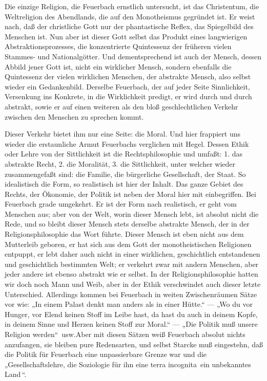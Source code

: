 Die einzige Religion, die Feuerbach ernstlich untersucht, ist
das Christentum, die Weltreligion des Abendlands, die auf den
Monotheismus gegründet ist. Er weist nach, daß der christliche Gott nur
der phantastische Reflex, das Spiegelbild des Menschen ist. Nun aber ist
dieser Gott selbst das Produkt eines langwierigen Abstraktionsprozesses,
die konzentrierte Quintessenz der früheren vielen Stammes- und
Nationalgötter. Und dementsprechend ist auch der Mensch, dessen Abbild
jener Gott ist, nicht ein wirklicher Mensch, sondern ebenfalls die
Quintessenz der vielen wirklichen Menschen, der abstrakte Mensch, also
selbst wieder ein Gedankenbild. Derselbe Feuerbach, der auf jeder Seite
Sinnlichkeit, Versenkung ins Konkrete, in die Wirklichkeit predigt, er
wird durch und durch abstrakt, sowie er auf einen weiteren als den bloß
geschlechtlichen Verkehr zwischen den Menschen zu sprechen kommt.

Dieser Verkehr bietet ihm nur eine Seite: die Moral. Und hier
frappiert uns wieder die erstaunliche Armut Feuerbachs verglichen mit
Hegel. Dessen Ethik oder Lehre von der Sittlichkeit ist die
Rechtsphilosophie und umfaßt: 1. das abstrakte Recht, 2. die Moralität,
3. die Sittlichkeit, unter welcher wieder zusammengefaßt sind: die
Familie, die bürgerliche Gesellschaft, der Staat. So idealistisch die
Form, so realistisch ist hier der Inhalt. Das ganze Gebiet des Rechts,
der Ökonomie, der Politik ist neben der Moral hier mit einbegriffen. Bei
Feuerbach grade umgekehrt. Er ist der Form nach realistisch, er geht vom
Menschen aus; aber von der Welt, worin dieser Mensch lebt, ist absolut
nicht die Rede, und so bleibt dieser Mensch stets derselbe abstrakte
Mensch, der in der Religionsphilosophie das Wort führte. Dieser Mensch
ist eben nicht aus dem Mutterleib geboren, er hat sich aus dem Gott der
monotheistischen Religionen entpuppt, er lebt daher auch nicht in einer
wirklichen, geschichtlich entstandenen und geschichtlich bestimmten
Welt; er verkehrt zwar mit andern Menschen, aber jeder andere ist ebenso
abstrakt wie er selbst. In der Religionsphilosophie hatten wir doch noch
Mann und Weib, aber in der Ethik verschwindet auch dieser letzte
Unterschied. Allerdings kommen bei Feuerbach in weiten Zwischenräumen
Sätze vor wie: „In einem Palast denkt man anders als in einer Hütte.`` ---
„Wo du vor Hunger, vor Elend keinen Stoff im Leibe hast, da hast du auch
in deinem Kopfe, in deinem Sinne und Herzen keinen Stoff zur Moral.`` ---
„Die Politik muß unsere Religion werden``\est\ usw.Aber mit diesen Sätzen weiß
Feuerbach absolut nichts anzufangen, sie bleiben pure Redensarten, und
selbst Starcke muß eingestehn, daß die Politik für Feuerbach eine
unpassierbare Grenze war und die „Gesellschaftslehre, die Soziologie für
ihn eine terra incognita \textbar{}\,ein unbekanntes Land\,\textbar{}``.

